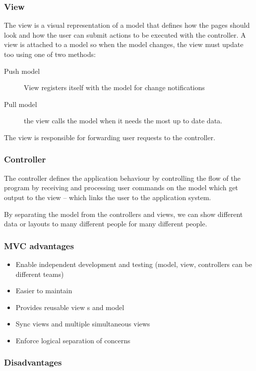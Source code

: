 \subsubsection{View}\label{ssub:view}

The view is a visual representation of a model that defines how the pages should look and how the user can submit actions to be executed with the controller.
A view is attached to a model so when the model changes, the view must update too using one of two methods:
\begin{description}
    \item[Push model] View registers itself with the model for change notifications
    \item[Pull model] the view calls the model when it needs the most up to date data.
\end{description}
The view is responsible for forwarding user requests to the controller.

\subsubsection{Controller}\label{ssub:controller}

The controller defines the application behaviour by controlling the flow of the program by receiving and processing user commands on the model which get output to the view -- which links the user to the application system.

By separating the model from the controllers and views, we can show different data or layouts to many different people for many different people.

\subsubsection{MVC advantages}\label{ssub:mvc_advantages}

\begin{itemize}
    \item Enable independent development and testing (model, view, controllers can be different teams)
    \item Easier to maintain
    \item Provides reusable view s and model
    \item Sync views and multiple simultaneous views
    \item Enforce logical separation of concerns
\end{itemize}

\subsubsection{Disadvantages}\label{ssub:disadvantages}

